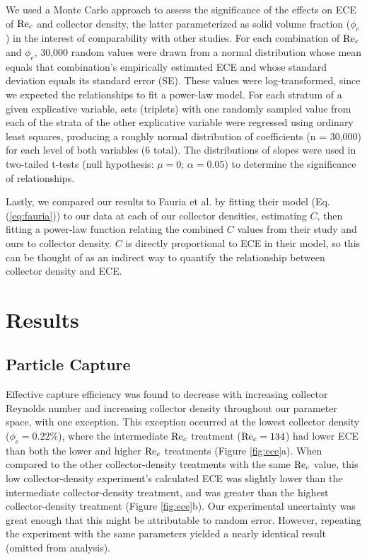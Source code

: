 \documentclass[geosciences,article,submit,moreauthors,pdftex]{Definitions/mdpi}
\begin{document}
We used a Monte Carlo approach to assess the significance of the effects on ECE of $\mathrm{Re}_c$ and collector density, the latter parameterized as solid volume fraction ($\phi_c$) in the interest of comparability with other studies. For each combination of $\mathrm{Re}_c$ and $\phi_c$, 30,000 random values were drawn from a normal distribution whose mean equals that combination's empirically estimated ECE and whose standard deviation equals its standard error (SE). These values were log-transformed, since we expected the relationships to fit a power-law model. For each stratum of a given explicative variable, sets (triplets) with one randomly sampled value from each of the strata of the other explicative variable were regressed using ordinary least squares, producing a roughly normal distribution of coefficients (n = 30,000) for each level of both variables (6 total). The distributions of slopes were used in two-tailed t-tests (null hypothesis: $\mu = 0$; $\alpha = 0.05$) to determine the significance of relationships.

Lastly, we compared our results to Fauria et al. \cite{Fauria_2015} by fitting their model (Eq. (\ref{eq:fauria})) to our data at each of our collector densities, estimating $C$, then fitting a power-law function relating the combined $C$ values from their study and ours to collector density. $C$ is directly proportional to ECE in their model, so this can be thought of as an indirect way to quantify the relationship between collector density and ECE.

\section{Results}

\subsection{Particle Capture}

Effective capture efficiency was found to decrease with increasing collector Reynolds number and increasing collector density throughout our parameter space, with one exception. This exception occurred at the lowest collector density ($\phi_c = 0.22\%$), where the intermediate $\mathrm{Re}_c$ treatment ($\mathrm{Re}_c = 134$) had lower ECE than both the lower and higher $\mathrm{Re}_c$ treatments (Figure \ref{fig:ece}a). When compared to the other collector-density treatments with the same $\mathrm{Re}_c$ value, this low collector-density experiment's calculated ECE was slightly lower than the intermediate collector-density treatment, and was greater than the highest collector-density treatment (Figure \ref{fig:ece}b). Our experimental uncertainty was great enough that this might be attributable to random error. However, repeating the experiment with the same parameters yielded a nearly identical result (omitted from analysis).
\end{document}
